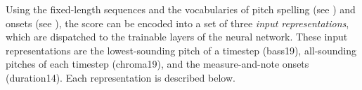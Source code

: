 
Using the fixed-length sequences and the vocabularies of
pitch spelling (see
) and onsets
(see
),
the score can be encoded into a set of three \emph{input
representations}, which are dispatched to the trainable
layers of the neural network. These input representations
are the lowest-sounding pitch of a timestep (\gls{bass19}),
all-sounding pitches of each timestep (\gls{chroma19}), and
the measure-and-note onsets (\gls{duration14}). Each
representation is described below.
